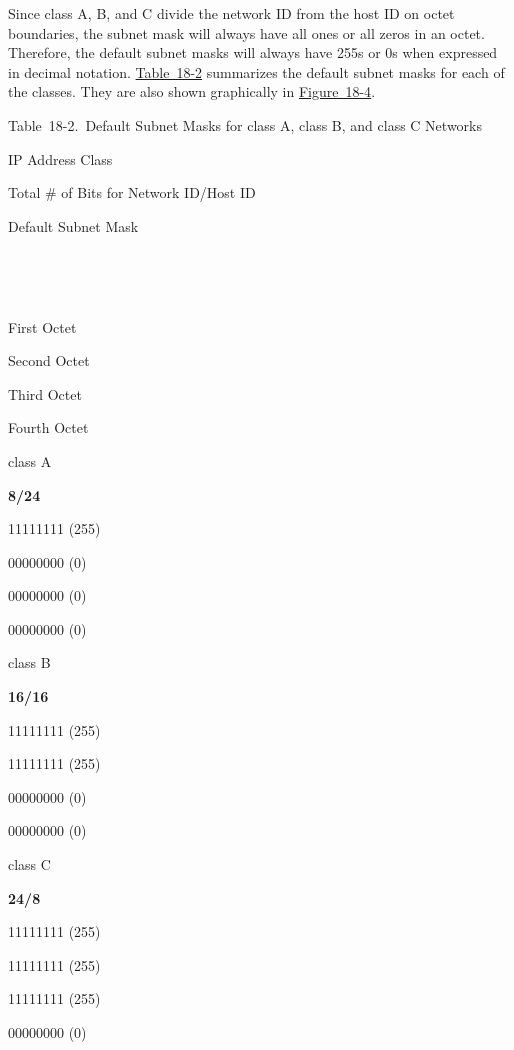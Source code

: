 \documentclass[b5paper,11pt]{memoir}
\begin{document}
Since class A, B, and C divide the network ID from the host ID on octet
boundaries, the subnet mask will always have all ones or all zeros in an
octet. Therefore, the default subnet masks will always have 255s or 0s
when expressed in decimal notation.
\protect\hyperlink{ch18s04.htmlux5cux23default_subnet_masks_for_class_a_class_b}{Table~18-2}
summarizes the default subnet masks for each of the classes. They are
also shown graphically in
\protect\hyperlink{ch18s04.htmlux5cux23default_subnet_masks_for_class_a_c-id001}{Figure~18-4}.

\protect\hypertarget{ch18s04.htmlux5cux23default_subnet_masks_for_class_a_class_b}{}{}

Table~18-2.~Default Subnet Masks for class A, class B, and class C
Networks

IP Address Class

Total \# of Bits for Network ID/Host ID

\protect\hypertarget{ch18s04.htmlux5cux23idx-CHP-18-0734}{}{}Default
Subnet Mask

~

~

First Octet

Second Octet

Third Octet

Fourth Octet

class A

{\textbf{8/24}}

11111111 (255)

00000000 (0)

00000000 (0)

00000000 (0)

class B

{\textbf{16/16}}

11111111 (255)

11111111 (255)

00000000 (0)

00000000 (0)

class C

{\textbf{24/8}}

11111111 (255)

11111111 (255)

11111111 (255)

00000000 (0)

\protect\hypertarget{ch18s04.htmlux5cux23default_subnet_masks_for_class_a_c-id001}{}{}

\protect\hypertarget{ch18s04.htmlux5cux23I_mediaobject4_d1e18589}{}{}
\end{document}
